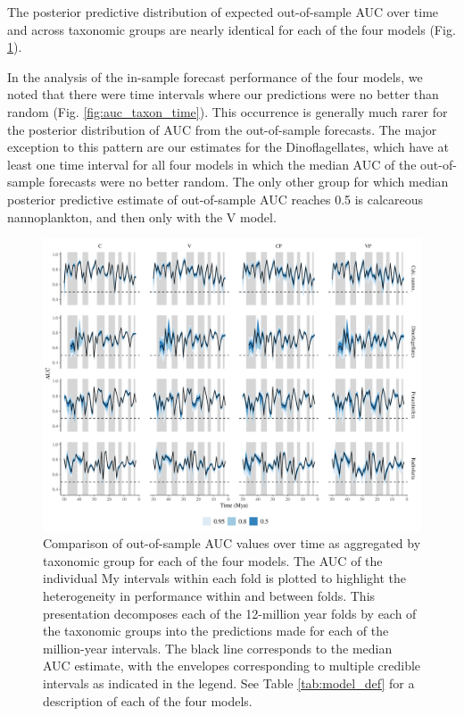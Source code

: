 \documentclass[12pt,letterpaper]{article}
\begin{document}
\begin{refsection}
The posterior predictive distribution of expected out-of-sample AUC over time and across taxonomic groups are nearly identical for each of the four models (Fig. \ref{fig:fold_auc_taxon_time}). 

In the analysis of the in-sample forecast performance of the four models, we noted that there were time intervals where our predictions were no better than random (Fig. \ref{fig:auc_taxon_time}). This occurrence is generally much rarer for the posterior distribution of AUC from the out-of-sample forecasts. The major exception to this pattern are our estimates for the Dinoflagellates, which have at least one time interval for all four models in which the median AUC of the out-of-sample forecasts were no better random. The only other group for which median posterior predictive estimate of out-of-sample AUC reaches 0.5 is calcareous nannoplankton, and then only with the V model.
\begin{figure}[ht]
 \centering
 \includegraphics[width=\textwidth,height=0.5\textheight,keepaspectratio=true]{../results/figure/fold_auc_taxon_time_full}
 \caption{Comparison of out-of-sample AUC values over time as aggregated by taxonomic group for each of the four models. The AUC of the individual My intervals within each fold is plotted to highlight the heterogeneity in performance within and between folds. This presentation decomposes each of the 12-million year folds by each of the taxonomic groups into the predictions made for each of the million-year intervals. The black line corresponds to the median AUC estimate, with the envelopes corresponding to multiple credible intervals as indicated in the legend. See Table \ref{tab:model_def} for a description of each of the four models.}
 \label{fig:fold_auc_taxon_time}
\end{figure}



\end{refsection}
\end{document}
